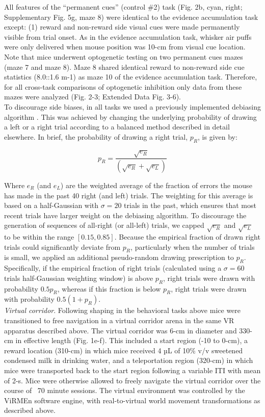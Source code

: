 All features of the “permanent cues” (control \#2) task (Fig. 2b, cyan, right; Supplementary Fig. 5g, maze 8) were identical to the evidence accumulation task except: (1) reward and non-reward side visual cues were made permanently visible from trial onset. As in the evidence accumulation task, whisker air puffs were only delivered when mouse position was 10-cm from visual cue location. Note that mice underwent optogenetic testing on two permanent cues mazes (maze 7 and maze 8). Maze 8 shared identical reward to non-reward side cue statistics (8.0::1.6 m-1) as maze 10 of the evidence accumulation task. Therefore, for all cross-task comparisons of optogenetic inhibition only data from these mazes were analyzed (Fig. 2-3; Extended Data Fig. 3-6). \\
To discourage side biases, in all tasks we used a previously implemented debiasing algorithm \cite{pinto_accumulation--evidence_2018}. This was achieved by changing the underlying probability of drawing a left or a right trial according to a balanced method described in detail elsewhere\cite{pinto_accumulation--evidence_2018}. In brief, the probability of drawing a right trial, $p_R$, is given by:

\begin{equation} \label{meq2}
p_R = \frac{{\sqrt {e_R} }}{{\left( {\sqrt {e_R} + \sqrt {e_L} } \right)}}
\end{equation}

Where $e_R$ (and $e_L$) are the weighted average of the fraction of errors the mouse has made in the past 40 right (and left) trials. The weighting for this average is based on a half-Gaussian with $ \sigma = 20$ trials in the past, which ensures that most recent trials have larger weight on the debiasing algorithm. To discourage the generation of sequences of all-right (or all-left) trials, we capped $\sqrt{e_R}$ and $\sqrt{e_L}$ to be within the range $[0.15, 0.85]$. Because the empirical fraction of drawn right trials could significantly deviate from $p_R$, particularly when the number of trials is small, we applied an additional pseudo-random drawing prescription to $p_R$. Specifically, if the empirical fraction of right trials (calculated using a $ \sigma = 60$ trials half-Gaussian weighting window) is above $p_R$, right trials were drawn with probability $0.5p_R$, whereas if this fraction is below $p_R$, right trials were drawn with probability $0.5(1+p_R)$. \\
\textit{Virtual corridor}. Following shaping in the behavioral tasks above mice were transitioned to free navigation in a virtual corridor arena in the same VR apparatus described above. The virtual corridor was 6-cm in diameter and 330-cm in effective length (Fig. 1e-f). This included a start region (-10 to 0-cm), a reward location (310-cm) in which mice received 4 µL of 10\% v/v sweetened condensed milk in drinking water, and a teleportation region (320-cm) in which mice were transported back to the start region following a variable ITI with mean of 2-s. Mice were otherwise allowed to freely navigate the virtual corridor over the course of ~70 minute sessions. The virtual environment was controlled by the ViRMEn software engine, with real-to-virtual world movement transformations as described above.